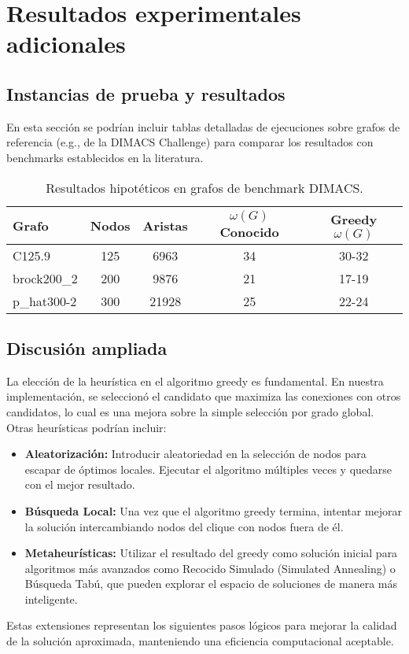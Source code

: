 \documentclass[12pt,a4paper]{report}
\begin{document}
\chapter{Resultados experimentales adicionales}
\section{Instancias de prueba y resultados}
En esta sección se podrían incluir tablas detalladas de ejecuciones sobre grafos de referencia (e.g., de la DIMACS Challenge) para comparar los resultados con benchmarks establecidos en la literatura.

\begin{table}[H]
    \centering
    \caption{Resultados hipotéticos en grafos de benchmark DIMACS.}
    \begin{tabular}{@{}lcccc@{}}
        \toprule
        \textbf{Grafo} & \textbf{Nodos} & \textbf{Aristas} & \textbf{$\omega(G)$ Conocido} & \textbf{Greedy $\omega(G)$} \\
        \midrule
        C125.9 & 125 & 6963 & 34 & 30-32 \\
        brock200\_2 & 200 & 9876 & 21 & 17-19 \\
        p\_hat300-2 & 300 & 21928 & 25 & 22-24 \\
        \bottomrule
    \end{tabular}
\end{table}

\section{Discusión ampliada}
La elección de la heurística en el algoritmo greedy es fundamental. En nuestra implementación, se seleccionó el candidato que maximiza las conexiones con otros candidatos, lo cual es una mejora sobre la simple selección por grado global. Otras heurísticas podrían incluir:
\begin{itemize}
    \item \textbf{Aleatorización:} Introducir aleatoriedad en la selección de nodos para escapar de óptimos locales. Ejecutar el algoritmo múltiples veces y quedarse con el mejor resultado.
    \item \textbf{Búsqueda Local:} Una vez que el algoritmo greedy termina, intentar mejorar la solución intercambiando nodos del clique con nodos fuera de él.
    \item \textbf{Metaheurísticas:} Utilizar el resultado del greedy como solución inicial para algoritmos más avanzados como Recocido Simulado (Simulated Annealing) o Búsqueda Tabú, que pueden explorar el espacio de soluciones de manera más inteligente.
\end{itemize}
Estas extensiones representan los siguientes pasos lógicos para mejorar la calidad de la solución aproximada, manteniendo una eficiencia computacional aceptable.
\end{document}
